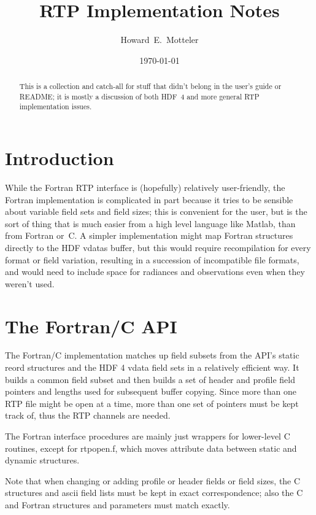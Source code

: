\documentclass[12pt]{article}
\title{{\bf RTP Implementation Notes}}
\author{Howard~E.~Motteler}
\date{\today\vspace{1cm}}
\begin{document}
\maketitle

\begin{abstract}

This is a collection and catch-all for stuff that didn't belong in
the user's guide or README; it is mostly a discussion of both HDF~4
and more general RTP implementation issues.

\end{abstract}

\bigskip\bigskip


\section{Introduction}

While the Fortran RTP interface is (hopefully) relatively
user-friendly, the Fortran implementation is complicated in part
because it tries to be sensible about variable field sets and field
sizes; this is convenient for the user, but is the sort of thing
that is much easier from a high level language like Matlab, than
from Fortran or~C.  A simpler implementation might map Fortran
structures directly to the HDF vdatas buffer, but this would require
recompilation for every format or field variation, resulting in a
succession of incompatible file formats, and would need to include
space for radiances and observations even when they weren't used.


\section{The Fortran/C API}

The Fortran/C implementation matches up field subsets from the API's
static reord structures and the HDF 4 vdata field sets in a
relatively efficient way.  It builds a common field subset and then
builds a set of header and profile field pointers and lengths used
for subsequent buffer copying.  Since more than one RTP file might
be open at a time, more than one set of pointers must be kept track
of, thus the RTP channels are needed.

The Fortran interface procedures are mainly just wrappers for
lower-level C routines, except for rtpopen.f, which moves attribute
data between static and dynamic structures.

Note that when changing or adding profile or header fields or field
sizes, the C structures and ascii field lists must be kept in exact
correspondence; also the C and Fortran structures and parameters
must match exactly.
\end{document}
